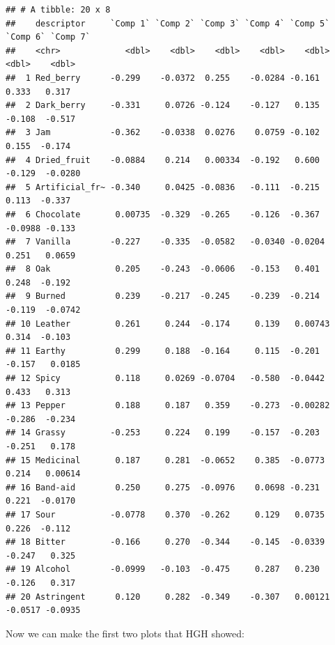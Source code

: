 \documentclass[
]{book}
\begin{document}
\begin{verbatim}
## # A tibble: 20 x 8
##    descriptor     `Comp 1` `Comp 2` `Comp 3` `Comp 4` `Comp 5` `Comp 6` `Comp 7`
##    <chr>             <dbl>    <dbl>    <dbl>    <dbl>    <dbl>    <dbl>    <dbl>
##  1 Red_berry      -0.299    -0.0372  0.255    -0.0284 -0.161     0.333   0.317  
##  2 Dark_berry     -0.331     0.0726 -0.124    -0.127   0.135    -0.108  -0.517  
##  3 Jam            -0.362    -0.0338  0.0276    0.0759 -0.102     0.155  -0.174  
##  4 Dried_fruit    -0.0884    0.214   0.00334  -0.192   0.600    -0.129  -0.0280 
##  5 Artificial_fr~ -0.340     0.0425 -0.0836   -0.111  -0.215     0.113  -0.337  
##  6 Chocolate       0.00735  -0.329  -0.265    -0.126  -0.367    -0.0988 -0.133  
##  7 Vanilla        -0.227    -0.335  -0.0582   -0.0340 -0.0204    0.251   0.0659 
##  8 Oak             0.205    -0.243  -0.0606   -0.153   0.401     0.248  -0.192  
##  9 Burned          0.239    -0.217  -0.245    -0.239  -0.214    -0.119  -0.0742 
## 10 Leather         0.261     0.244  -0.174     0.139   0.00743   0.314  -0.103  
## 11 Earthy          0.299     0.188  -0.164     0.115  -0.201    -0.157   0.0185 
## 12 Spicy           0.118     0.0269 -0.0704   -0.580  -0.0442    0.433   0.313  
## 13 Pepper          0.188     0.187   0.359    -0.273  -0.00282  -0.286  -0.234  
## 14 Grassy         -0.253     0.224   0.199    -0.157  -0.203    -0.251   0.178  
## 15 Medicinal       0.187     0.281  -0.0652    0.385  -0.0773    0.214   0.00614
## 16 Band-aid        0.250     0.275  -0.0976    0.0698 -0.231     0.221  -0.0170 
## 17 Sour           -0.0778    0.370  -0.262     0.129   0.0735    0.226  -0.112  
## 18 Bitter         -0.166     0.270  -0.344    -0.145  -0.0339   -0.247   0.325  
## 19 Alcohol        -0.0999   -0.103  -0.475     0.287   0.230    -0.126   0.317  
## 20 Astringent      0.120     0.282  -0.349    -0.307   0.00121  -0.0517 -0.0935
\end{verbatim}

Now we can make the first two plots that HGH showed:
\end{document}
